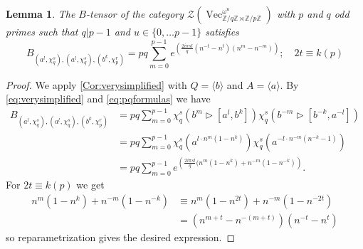 \documentclass[a4paper, 10pt]{book}
\newtheorem{Lem}[theorem]{Lemma}
\theoremstyle{definition}
\numberwithin{equation}{chapter}
\newcommand\hit{\triangleright}
\newcommand\Vect{\operatorname{Vec}}
\newcommand\ZZ{\mathbb Z}
\newcommand\CTR{\mathcal Z}
\newcommand\semdir{\rtimes}
\begin{document}
\begin{Lem}\label{BProp} The $B$-tensor of the category $\CTR(\Vect_{\ZZ/q\ZZ \semdir \ZZ/p\ZZ}^{\omega^u})$ with $p$ and $q$ odd primes such that $q|p-1$ and $u\in\{0,\dots p-1\}$ satisfies
\begin{equation}
B_{(a^l,\chi_q^s),(a^l, \chi_q^s),(b^{k}, \chi_p^r)}=p q \sum_{m=0}^{p-1} e^{\left(\frac{2i\pi sl}{q} (n^{-t}-n^t)(n^m-n^{-m})\right)};\quad 2t\equiv k(p) 
\end{equation}
\end{Lem}

\begin{proof}
We apply \cref{Cor:verysimplified} with $Q=\langle b\rangle$ and $A=\langle a\rangle$.
By \cref{eq:verysimplified} and \cref{eq:pqformulas} we have
\begin{align*}
  B_{(a^l,\chi_q^s),(a^l, \chi_q^s),(b^k, \chi_p^r)} &=pq\sum_{m=0}^{p-1}\chi_q^s(b^m \hit[a^l,b^k])\chi_q^s(b^{-m} \hit[b^{-k},a^{-l}] )\\
  &=p q \sum_{m=0}^{p-1} \chi_q^s(a^{l \cdot n^m (1-n^k)})\chi_q^s(a^{-l \cdot n^{-m} (n^{-k}-1)})\\
&= p q \sum_{m=0}^{p-1} e^{\left(\frac{2i\pi sl}{q} (n^{m}(1-n^k)+n^{-m}(1-n^{-k})\right)}.
\end{align*}
For $2t\equiv k(p)$ we get
\begin{align*}
  n^{m}(1-n^k)+n^{-m}(1-n^{-k})&\equiv n^m(1-n^{2t})+n^{-m}(1-n^{-2t})\\&=(n^{m+t}-n^{-(m+t)})(n^{-t}-n^t)
\end{align*}
so reparametrization gives the desired expression.
\end{proof}
\end{document}
